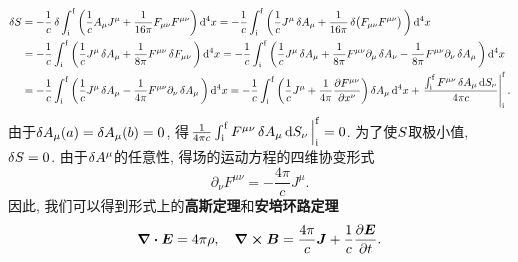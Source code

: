 \begin{align*}
    \var{\action} &= -\frac{1}{c} \var{\int_{\init}^{\fini} \bigg(\frac{1}{c} A_{\mu} J^{\mu} + \frac{1}{16 \pi} F_{\mu\nu} F^{\mu\nu} \bigg) \dd[4]{x}}
    = -\frac{1}{c} \int_{\init}^{\fini} \bigg(\frac{1}{c} J^{\mu}\var{A_{\mu}} + \frac{1}{16 \pi} \var{\big(F_{\mu\nu} F^{\mu\nu}\big)} \bigg) \dd[4]{x} \\
    &= -\frac{1}{c} \int_{\init}^{\fini} \bigg(\frac{1}{c} J^{\mu}\var{A_{\mu}} + \frac{1}{8 \pi} F^{\mu\nu} \var{F_{\mu\nu}} \bigg) \dd[4]{x} = -\frac{1}{c} \int_{\init}^{\fini} \bigg(\frac{1}{c} J^{\mu}\var{A_{\mu}} + \frac{1}{8 \pi} F^{\mu\nu} \partial_{\mu} \var{A_{\nu}} - \frac{1}{8 \pi} F^{\mu\nu} \partial_{\nu} \var{A_{\mu}} \bigg) \dd[4]{x}\\
    &= -\frac{1}{c} \int_{\init}^{\fini} \bigg(\frac{1}{c} J^{\mu}\var{A_{\mu}} - \frac{1}{4 \pi} F^{\mu\nu} \partial_{\nu} \var{A_{\mu}} \bigg) \dd[4]{x} = -\frac{1}{c} \int_{\init}^{\fini} \bigg(\frac{1}{c} J^{\mu} + \frac{1}{4 \pi} \pdv{F^{\mu\nu}}{x^{\nu}} \bigg) \var{A_{\mu}} \dd[4]{x} +\eval{\frac{\int_{\init}^{\fini} F^{\mu\nu} \var{A_{\mu}} \dd{S_{\nu}}}{4\pi c}}_{\init}^{\fini}.
\end{align*}
由于$ \var{A_{\mu}(a)}=\var{A_{\mu}(b)}=0 $, 得$ \eval{\frac{1}{4\pi c} \int_{\init}^{\fini} F^{\mu\nu} \var{A_{\mu}} \dd{S_{\nu}}}_{\init}^{\fini}=0 $. 为了使$ S $取极小值, $ \var{S}=0 $. 由于$ \var{A^{\mu}} $的任意性, 得场的运动方程的四维协变形式
\begin{equation}
    \partial_{\nu} F^{\mu\nu} = -\frac{4\pi}{c} J^{\mu}.
\end{equation}
因此, 我们可以得到形式上的\textbf{高斯定理}和\textbf{安培环路定理}
\begin{equation}
    \div{\vb*{E}} = 4\pi\rho, \quad \curl{\vb*{B}} = \frac{4\pi}{c} \vb*{J} + \frac{1}{c} \pdv{\vb*{E}}{t}.
\end{equation}

